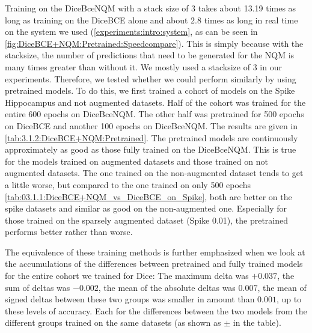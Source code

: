 Training on the DiceBceNQM with a stack size of 3 takes about 13.19 times as long as training on the DiceBCE alone and about 2.8 times as long in real time on the system we used (\autoref{experiments:intro:system}, as can be seen in \autoref{fig:DiceBCE+NQM:Pretrained:Speedcompare}). This is simply because with the stacksize, the number of predictions that need to be generated for the NQM is many times greater than without it. We mostly used a stacksize of 3 in our experiments. Therefore, we tested whether we could perform similarly by using pretrained models. To do this, we first trained a cohort of models on the Spike Hippocampus and not augmented datasets. Half of the cohort was trained for the entire 600 epochs on DiceBceNQM. The other half was pretrained for 500 epochs on DiceBCE and another 100 epochs on DiceBceNQM. The results are given in \autoref{tab:3.1.2:DiceBCE+NQM:Pretrained}. The pretrained models are continuously approximately as good as those fully trained on the DiceBceNQM. This is true for the models trained on augmented datasets and those trained on not augmented datasets. The one trained on the non-augmented dataset tends to get a little worse, but compared to the one trained on only 500 epochs \autoref{tab:03.1.1:DiceBCE+NQM_vs_DiceBCE_on_Spike}, both are better on the spike datasets and similar as good on the non-augmented one. Especially for those trained on the sparsely augmented dataset (Spike 0.01), the pretrained performs better rather than worse. 

The equivalence of these training methods is further emphasized when we look at the accumulations of the differences between pretrained and fully trained models for the entire cohort we trained for Dice: The maximum delta was $+ 0.037$, the sum of deltas was $-0.002$, the mean of the absolute deltas was $0.007$, the mean of signed deltas between these two groups was smaller in amount than $0.001$, up to these levels of accuracy. Each for the differences between the two models from the different groups trained on the same datasets (as shown as $\pm$ in the table).
